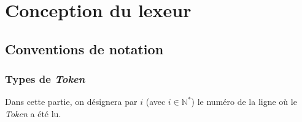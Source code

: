 \documentclass[a4paper, 12pt]{report}
\begin{document}

\chapter{Conception du lexeur}

\section{Conventions de notation}

\subsection{Types de \textit{Token}}

Dans cette partie, on désignera par $i$ (avec $i \in \mathbb{N}^*$) le numéro de la ligne où le \textit{Token} a été lu.\\
\end{document}
